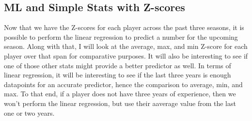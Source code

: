 \documentclass[11pt]{article}
\begin{document}
    \subsection{ML and Simple Stats with
Z-scores}\label{ml-and-simple-stats-with-z-scores}

Now that we have the Z-scores for each player across the past three
seasons, it is possible to perform the linear regression to predict a
number for the upcoming season. Along with that, I will look at the
average, max, and min Z-score for each player over that span for
comparative purposes. It will also be interesting to see if one of those
other stats might provide a better predictor as well. In terms of linear
regression, it will be interesting to see if the last three years is
enough datapoints for an accurate predictor, hence the comparison to
average, min, and max. To that end, if a player does not have three
years of experience, then we won't perform the linear regression, but
use their aaverage value from the last one or two years.
\end{document}
